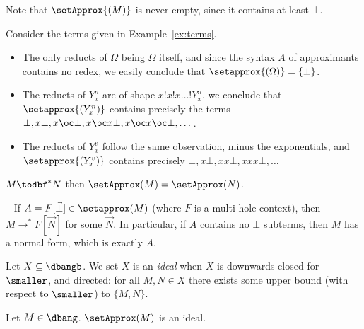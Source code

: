 Note that $\setApprox{(M)}$ is never empty, since it contains at least $\bot$.

\begin{example}\label{ex:terms-approx}
	Consider the terms given in Example~\ref{ex:terms}.
	\begin{itemize}
		\item The only reducts of $\Omega$ being $\Omega$ itself, and
			since the syntax $A$ of approximants contains no redex,
			we easily conclude that $\setapprox{(\Omega)}=\{\bot\}$.
		\item The reducts of $Y_x^n$ are of shape $x!x!x\dots !Y_x^n$, we
			conclude that $\setapprox{(Y_x^n)}$ contains precisely
			the terms $\bot,x\bot,x\oc\bot,x\oc x\bot,x\oc
			x\oc\bot,\dots $.
		\item The reducts of $Y_x^v$ follow the same observation, minus
			the exponentials, and $\setapprox{(Y_x^v)}$ contains
			precisely $\bot, x\bot,xx\bot,xxx\bot,\dots $
	\end{itemize}
\end{example}

\begin{lemma}
	\label{lem:bang:bohm:reduce-have-same-approxs}
	$M \todbf^* N$ then $\setApprox(M) = \setApprox(N)$.
\end{lemma}

\begin{remark}~\label{rem:approx-normal}
	If $A=F[\vec\bot]\in\setapprox(M)$ (where $F$ is a
	multi-hole context), then $M\to^*F[\vec N]$ for some $\vec N$. In particular, if
	$A$ contains no $\bot$ subterms, then $M$ has a normal form, which is
	exactly $A$.
\end{remark}

\begin{definition}[Ideal]
	Let $X\subseteq \dbangb$. We set $X$ is an \emph{ideal} when $X$ is
	downwards closed for $\smaller$, and directed: for all $M, N \in X$
	there exists some upper	bound (with respect to $\smaller$) to
	$\{M,N\}$.
\end{definition}

\begin{lemma}\label{lem:ideal}
	Let $M\in\dbang$. $\setApprox(M)$ is an ideal.
\end{lemma}
	
